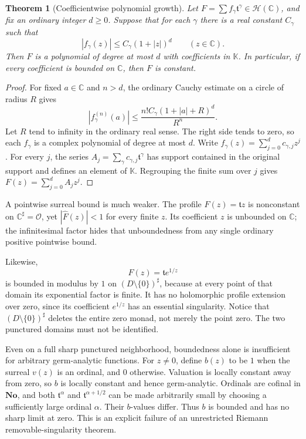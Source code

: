 \documentclass[11pt,a4paper]{article}
\numberwithin{equation}{section}
\newtheorem{theorem}{Theorem}[section]
\theoremstyle{definition}
\newcommand{\No}{\mathbf{No}}
\newcommand{\K}{\mathbb K}
\newcommand{\C}{\mathbb C}
\newcommand{\tmon}{\mathfrak t}
\newcommand{\OO}{\mathcal O}
\newcommand{\HH}{\mathscr H}
\newcommand{\hhat}[1]{\widehat{#1}}
\begin{document}
\begin{theorem}[Coefficientwise polynomial growth]\label{thm:growth}
Let $F=\sum f_\gamma\tmon^\gamma\in\HH(\C)$, and fix an ordinary integer
$d\geq0$. Suppose that for each $\gamma$ there is a real constant $C_\gamma$
such that
\[
 |f_\gamma(z)|\leq C_\gamma(1+|z|)^d\qquad(z\in\C).
\]
Then $F$ is a polynomial of degree at most $d$ with coefficients in $\K$.
In particular, if every coefficient is bounded on $\C$, then $F$ is constant.
\end{theorem}
\begin{proof}
For fixed $a\in\C$ and $n>d$, the ordinary Cauchy estimate on a circle of
radius $R$ gives
\[
 |f_\gamma^{(n)}(a)|\leq
 \frac{n!C_\gamma(1+|a|+R)^d}{R^n}.
\]
Let $R$ tend to infinity in the ordinary real sense. The right side tends
to zero, so each $f_\gamma$ is a complex polynomial of degree at most $d$.
Write $f_\gamma(z)=\sum_{j=0}^d c_{\gamma,j}z^j$. For every $j$, the series
$A_j=\sum_\gamma c_{\gamma,j}\tmon^\gamma$ has support contained in the original
support and defines an element of $\K$. Regrouping the finite sum over $j$
gives $F(z)=\sum_{j=0}^d A_jz^j$.
\end{proof}

A pointwise surreal bound is much weaker. The profile $F(z)=\tmon z$ is
nonconstant on $\C^\sharp=\OO$, yet $|\hhat F(z)|<1$ for every finite $z$.
Its coefficient $z$ is unbounded on $\C$; the infinitesimal factor hides that
unboundedness from any single ordinary positive pointwise bound.

Likewise,
\[
 F(z)=\tmon e^{1/z}
\]
is bounded in modulus by $1$ on $(D\setminus\{0\})^\sharp$, because at every
point of that domain its exponential factor is finite. It has no holomorphic
profile extension over zero, since its coefficient $e^{1/z}$ has an essential
singularity. Notice that $(D\setminus\{0\})^\sharp$ deletes the entire zero
monad, not merely the point zero. The two punctured domains must not be
identified.

Even on a full sharp punctured neighborhood, boundedness alone is insufficient
for arbitrary germ-analytic functions. For $z\neq0$, define $b(z)$ to be $1$
when the surreal $v(z)$ is an ordinal, and $0$ otherwise. Valuation is locally
constant away from zero, so $b$ is locally constant and hence germ-analytic.
Ordinals are cofinal in $\No$, and both $\tmon^\alpha$ and
$\tmon^{\alpha+1/2}$ can be made arbitrarily small by choosing a sufficiently
large ordinal $\alpha$. Their $b$-values differ. Thus $b$ is bounded and has
no sharp limit at zero. This is an explicit failure of an unrestricted
Riemann removable-singularity theorem.
\end{document}

